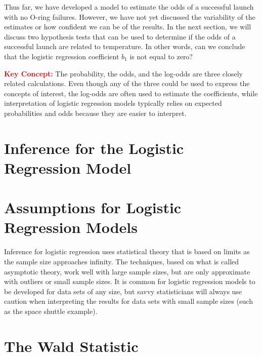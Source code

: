 \documentclass[
]{report}
\begin{document}
Thus far, we have developed a model to estimate the odds of a successful launch with no O-ring failures. However, we have not yet discussed the variability of the estimates or how confident we can be of the results. In the next section, we will discuss two hypothesis tests that can be used to determine if the odds of a successful launch are related to temperature. In other words, can we conclude that the logistic regression coefficient \(b_1\) is not equal to zero?

\Large

\textbf{\textcolor{red}{Key Concept:}}
\color{red}
The probability, the odds, and the log-odds are three closely related calculations. Even though any of
the three could be used to express the concepts of interest, the log-odds are often used to estimate the
coefficients, while interpretation of logistic regression models typically relies on expected probabilities
and odds because they are easier to interpret.
\color{black}
\normalsize

\section{\texorpdfstring{\textbf{Inference for the Logistic Regression Model}}{Inference for the Logistic Regression Model}}\label{inference-for-the-logistic-regression-model}

\section*{Assumptions for Logistic Regression Models}\label{assumptions-for-logistic-regression-models}

Inference for logistic regression uses statistical theory that is based on limits as the sample size approaches infinity. The techniques, based on what is called asymptotic theory, work well with large sample sizes, but are only approximate with outliers or small sample sizes. It is common for logistic regression models to be developed for data sets of any size, but savvy statisticians will always use caution when interpreting the results for data sets with small sample sizes (such as the space shuttle example).

\section*{The Wald Statistic}\label{the-wald-statistic}
\end{document}
